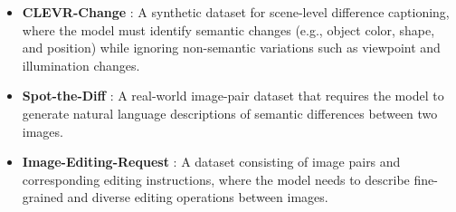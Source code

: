 \begin{itemize}
    \item \textbf{CLEVR-Change} \citep{park2019robust}: A synthetic dataset for scene-level difference captioning, where the model must identify semantic changes (e.g., object color, shape, and position) while ignoring non-semantic variations such as viewpoint and illumination changes.

    \item \textbf{Spot-the-Diff} \citep{jhamtani2018learning}: A real-world image-pair dataset that requires the model to generate natural language descriptions of semantic differences between two images.

    \item \textbf{Image-Editing-Request} \citep{tan2019expressing}: A dataset consisting of image pairs and corresponding editing instructions, where the model needs to describe fine-grained and diverse editing operations between images.
\end{itemize}
